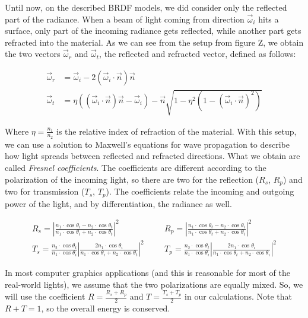 Until now, on the described BRDF models, we did consider only the reflected part of the radiance. When a beam of light coming from direction $\vec{\omega}_i$ hits a surface, only part of the incoming radiance gets reflected, while another part gets refracted into the material. As we can see from the setup from figure Z, we obtain the two vectors $\vec{\omega}_r$ and $\vec{\omega}_t$, the reflected and refracted vector, defined as follows:

\begin{equation*}
\begin{split}
\vec{\omega}_r &= \vec{\omega}_i - 2 (\vec{\omega}_i \cdot \vec{n}) \vec{n} \\
\vec{\omega}_t &= \eta ((\vec{\omega}_i \cdot \vec{n}) \vec{n} - \vec{\omega}_i) - \vec{n} \sqrt{1 - \eta^2 (1 - (\vec{\omega}_i \cdot \vec{n}) ^ 2)}
\end{split}
\end{equation*}

Where $\eta = \frac{n_1}{n_2}$ is the relative index of refraction of the material. With this setup, we can use a solution to Maxwell's equations for wave propagation to describe how light spreads between reflected and refracted directions. What we obtain are called \emph{Fresnel coefficients}. The coefficients are different according to the polarization of the incoming light, so there are two for the reflection ($R_s$, $R_p$) and two for transmission ($T_s$, $T_p$). The coefficients relate the incoming and outgoing power of the light, and by differentiation, the radiance as well.

\begin{equation*}
\begin{split}
R_s = \left|\frac{n_1 \cdot \cos\theta_i - n_2 \cdot \cos\theta_t} {n_1 \cdot \cos\theta_i + n_2 \cdot \cos\theta_t}\right|^2 \;\;\;&\;\;\; R_p = \left|\frac{n_1 \cdot \cos\theta_t - n_2 \cdot \cos\theta_i} {n_1 \cdot \cos\theta_t + n_2 \cdot \cos\theta_i}\right|^2\\
T_s = \frac{n_2 \cdot \cos\theta_t}{n_1 \cdot \cos\theta_i} \left|\frac{2 n_1 \cdot \cos\theta_i}{n_1 \cdot \cos\theta_i + n_2 \cdot \cos\theta_t}\right|^2 \;\;\;&\;\;\; T_p = \frac{n_2 \cdot \cos\theta_t}{n_1 \cdot \cos\theta_i}  \left|\frac{2 n_1 \cdot \cos\theta_i}{n_1 \cdot \cos\theta_t + n_2 \cdot \cos\theta_i}\right|^2
\end{split}
\end{equation*}


In most computer graphics applications (and this is reasonable for most of the real-world lights), we assume that the two polarizations are equally mixed. So, we will use the coefficient $R = \frac{R_s + R_p}{2}$ and $T = \frac{T_s + T_p}{2}$ in our calculations. Note that $R + T = 1$, so the overall energy is conserved.

